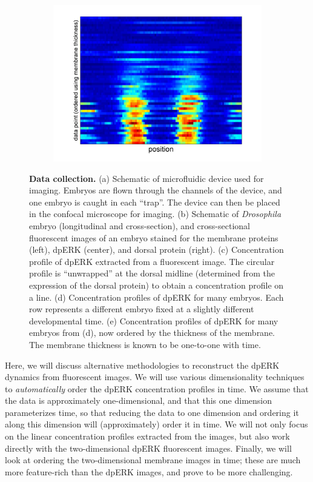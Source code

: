\documentclass[10pt]{article}
\begin{document}
\begin{figure}[!ht]
\begin{center}
\begin{subfigure}{0.4\textwidth}
\includegraphics[width=\textwidth]{data_ordered_membrane}
\caption{}
\end{subfigure}
\end{center}
\caption{{\bf Data collection.} (a) Schematic of microfluidic device used for imaging. Embryos are flown through the channels of the device, and one embryo is caught in each ``trap''. The device can then be placed in the confocal microscope for imaging. (b) Schematic of {\em Drosophila} embryo (longitudinal and cross-section), and cross-sectional fluorescent images of an embryo stained for the membrane proteins (left), dpERK (center), and dorsal protein (right).
(c) Concentration profile of dpERK extracted from a fluorescent image. The circular profile is ``unwrapped'' at the dorsal midline (determined from the expression of the dorsal protein) to obtain a concentration profile on a line.
(d) Concentration profiles of dpERK for many embryos. Each row represents a different embryo fixed at a slightly different developmental time.
(e) Concentration profiles of dpERK for many embryos from (d), now ordered by the thickness of the membrane. The membrane thickness is known to be one-to-one with time.}
\label{fig:background}
\end{figure}

Here,  we will discuss alternative methodologies to reconstruct the dpERK dynamics from fluorescent images. 
%
We will use various dimensionality techniques to {\em automatically} order the dpERK concentration profiles in time.
%
We assume that the data is approximately one-dimensional, and that this one dimension parameterizes time, so that reducing the data to one dimension and ordering it along this dimension will (approximately) order it in time. 
%
We will not only focus on the linear concentration profiles extracted from the images, but also work directly with the two-dimensional dpERK fluorescent images. 
%
Finally, we will look at ordering the two-dimensional membrane images in time; these are much more feature-rich than the dpERK images, and prove to be more challenging.
\end{document}
